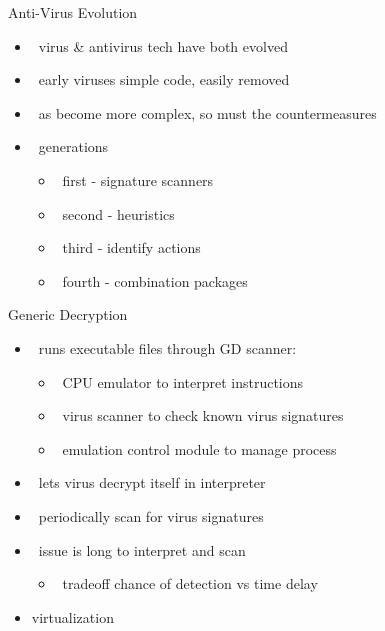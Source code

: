 \documentclass{beamer}
\begin{document}


\begin{frame}{Anti-Virus Evolution }
  \begin{itemize}
  \item  virus \& antivirus tech have both evolved 
  \item  early viruses simple code, easily removed 
  \item  as become more complex, so must the 
    countermeasures 
  \item  generations 
    \begin{itemize}
    \item  first - signature scanners 
    \item  second - heuristics 
    \item  third - identify actions 
    \item  fourth - combination packages 
    \end{itemize}
  \end{itemize}
\end{frame}

\begin{frame}{Generic Decryption }
  \begin{itemize}
  \item  runs executable files through GD scanner: 
    \begin{itemize}
    \item  CPU emulator to interpret instructions 
    \item  virus scanner to check known virus signatures 
    \item  emulation control module to manage process 
    \end{itemize}
  \item  lets virus decrypt itself in interpreter 
  \item  periodically scan for virus signatures 
  \item  issue is long to interpret and scan 
    \begin{itemize}
    \item  tradeoff chance of detection vs time delay
    \end{itemize}
  \item virtualization
  \end{itemize}
\end{frame}
\end{document}
